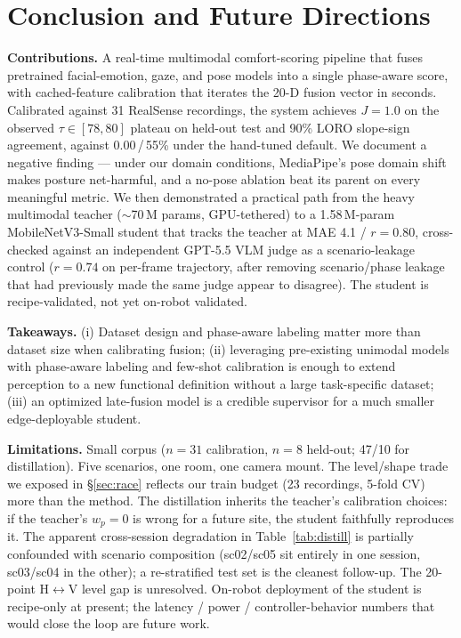 \documentclass{article}
\begin{document}
\section{Conclusion and Future Directions}

\textbf{Contributions.} A real-time multimodal comfort-scoring pipeline that fuses pretrained facial-emotion, gaze, and pose models into a single phase-aware score, with cached-feature calibration that iterates the 20-D fusion vector in seconds. Calibrated against 31 RealSense recordings, the system achieves $J = 1.0$ on the observed $\tau \in [78, 80]$ plateau on held-out test and 90\% LORO slope-sign agreement, against 0.00\,/\,55\% under the hand-tuned default. We document a negative finding --- under our domain conditions, MediaPipe's pose domain shift makes posture net-harmful, and a no-pose ablation beat its parent on every meaningful metric. We then demonstrated a practical path from the heavy multimodal teacher ($\sim$70\,M params, GPU-tethered) to a 1.58\,M-param MobileNetV3-Small student that tracks the teacher at MAE 4.1 / $r = 0.80$, cross-checked against an independent GPT-5.5 VLM judge as a scenario-leakage control ($r = 0.74$ on per-frame trajectory, after removing scenario/phase leakage that had previously made the same judge appear to disagree). The student is recipe-validated, not yet on-robot validated.

\textbf{Takeaways.} (i) Dataset design and phase-aware labeling matter more than dataset size when calibrating fusion; (ii) leveraging pre-existing unimodal models with phase-aware labeling and few-shot calibration is enough to extend perception to a new functional definition without a large task-specific dataset; (iii) an optimized late-fusion model is a credible supervisor for a much smaller edge-deployable student.

\textbf{Limitations.} Small corpus ($n=31$ calibration, $n=8$ held-out; 47/10 for distillation). Five scenarios, one room, one camera mount. The level/shape trade we exposed in \S\ref{sec:race} reflects our train budget (23 recordings, 5-fold CV) more than the method. The distillation inherits the teacher's calibration choices: if the teacher's $w_p = 0$ is wrong for a future site, the student faithfully reproduces it. The apparent cross-session degradation in Table~\ref{tab:distill} is partially confounded with scenario composition (sc02/sc05 sit entirely in one session, sc03/sc04 in the other); a re-stratified test set is the cleanest follow-up. The 20-point H$\leftrightarrow$V level gap is unresolved. On-robot deployment of the student is recipe-only at present; the latency / power / controller-behavior numbers that would close the loop are future work.
\end{document}
